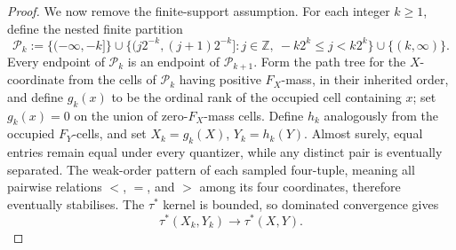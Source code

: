 \documentclass[12pt]{article}
\begin{document}
\begin{proof}
We now remove the finite-support assumption.  For each integer $k\ge1$, define
the nested finite partition
\begin{equation}\label{eq:nested-partitions}
\mathcal P_k:=\{(-\infty,-k]\}
\cup\{(j2^{-k},(j+1)2^{-k}]:j\in\mathbb Z,\ -k2^k\le j<k2^k\}
\cup\{(k,\infty)\}.
\end{equation}
Every endpoint of $\mathcal P_k$ is an endpoint of
$\mathcal P_{k+1}$.  Form the path tree for the $X$-coordinate from the cells
of $\mathcal P_k$
having positive $F_X$-mass, in their inherited order, and define $g_k(x)$
to be the ordinal rank of the occupied cell containing $x$; set $g_k(x)=0$
on the union of zero-$F_X$-mass cells.  Define $h_k$ analogously
from the occupied $F_Y$-cells, and set $X_k=g_k(X)$, $Y_k=h_k(Y)$.  Almost
surely, equal entries remain equal under every quantizer, while any distinct
pair is eventually separated.  The weak-order pattern of each sampled
four-tuple, meaning all pairwise relations $<$, $=$, and $>$ among
its four coordinates, therefore eventually stabilises.
The $\tau^*$ kernel is bounded, so dominated convergence gives
\begin{equation}\label{eq:tau-quantisation-limit}
\tau^*(X_k,Y_k)\longrightarrow\tau^*(X,Y).
\end{equation}


\end{proof}
\end{document}
